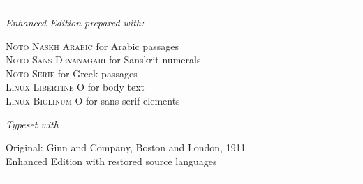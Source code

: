 \documentclass[11pt,a4paper]{article}
\begin{document}
\newpage

\thispagestyle{empty}
\vspace*{5cm}

\begin{center}
\rule{0.4\textwidth}{0.4pt}

\vspace{1cm}

{\small\textit{Enhanced Edition prepared with:}}

\vspace{0.3cm}

{\footnotesize
\textsc{Noto Naskh Arabic} for Arabic passages\\
\textsc{Noto Sans Devanagari} for Sanskrit numerals\\
\textsc{Noto Serif} for Greek passages\\
\textsc{Linux Libertine O} for body text\\
\textsc{Linux Biolinum O} for sans-serif elements\\
}

\vspace{0.8cm}

{\small\textit{Typeset with \XeLaTeX}}

\vspace{0.5cm}

{\footnotesize
Original: Ginn and Company, Boston and London, 1911\\
Enhanced Edition with restored source languages\\
}

\vspace{0.5cm}
\rule{0.4\textwidth}{0.4pt}
\end{center}
\end{document}
